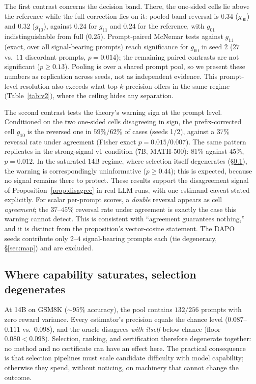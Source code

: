 \documentclass[11pt]{article}
\newcommand{\goo}{g_{00}}
\newcommand{\gto}{g_{10}}
\newcommand{\got}{g_{01}}
\newcommand{\gtt}{g_{11}}
\begin{document}
The first contrast concerns the decision band. There, the one-sided cells lie
above the reference while the full correction lies on it: pooled band
reversal is $0.34$ ($\goo$) and $0.32$ ($\gto$), against $0.24$ for $\gtt$
and $0.24$ for the reference, with $\got$ indistinguishable from full
($0.25$). Prompt-paired McNemar tests against $\gtt$ (exact, over all
signal-bearing prompts) reach significance for $\goo$ in seed 2 ($27$ vs.\
$11$ discordant prompts, $p=0.014$); the remaining paired contrasts are not
significant ($p\ge 0.13$). Pooling is over a shared prompt pool, so we
present these numbers as replication across seeds, not as independent
evidence. This prompt-level resolution also exceeds what top-$k$ precision
offers in the same regime (Table~\ref{tab:v2}), where the ceiling hides any
separation.

The second contrast tests the theory's warning sign at the prompt level.
Conditioned on the two one-sided cells disagreeing in sign, the
prefix-corrected cell $\gto$ is the reversed one in $59\%$/$62\%$ of cases
(seeds 1/2), against a $37\%$ reversal rate under agreement (Fisher exact
$p=0.015$/$0.007$). The same pattern replicates in the strong-signal v1
condition (7B, MATH-500): $81\%$ against $45\%$, $p=0.012$. In the saturated
14B regime, where selection itself degenerates (\S\ref{sec:saturation}),
the warning is correspondingly uninformative ($p\ge 0.44$); this is
expected, because no signal remains there to protect. These results support
the disagreement signal of Proposition~\ref{prop:disagree} in real LLM
runs, with one estimand caveat stated explicitly. For scalar per-prompt
scores, a \emph{double} reversal appears as cell \emph{agreement}; the
$37$--$45\%$ reversal rate under agreement is exactly the case this warning
cannot detect. This is consistent with ``agreement guarantees nothing,'' and
it is distinct from the proposition's vector-cosine statement. The DAPO
seeds contribute only $2$--$4$ signal-bearing prompts each (tie degeneracy,
\S\ref{sec:map}) and are excluded.

\subsection{Where capability saturates, selection degenerates}
\label{sec:saturation}

At 14B on GSM8K (${\sim}95\%$ accuracy), the pool contains $132/256$
prompts with zero reward variance. Every estimator's precision equals the
chance level ($0.087$--$0.111$ vs.\ $0.098$), and the oracle disagrees
\emph{with itself} below chance (floor $0.080<0.098$). Selection, ranking,
and certification therefore degenerate together: no method and no
certificate can have an effect here. The practical consequence is that
selection pipelines must scale candidate difficulty with model capability;
otherwise they spend, without noticing, on machinery that cannot change the
outcome.
\end{document}
